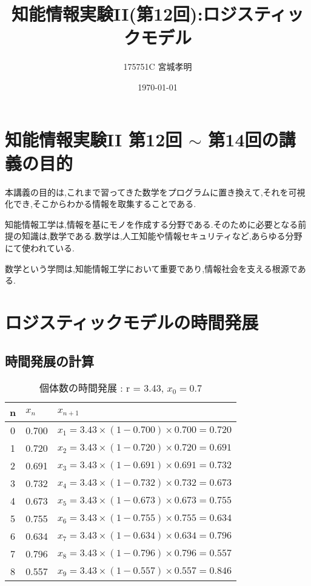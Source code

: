 \documentclass[a4paper,11pt,titlepage]{jarticle}
\title{知能情報実験II(第12回):ロジスティックモデル}
\author{175751C 宮城孝明}
\date{\today}
\begin{document}
\maketitle
\tableofcontents
\clearpage

\section{知能情報実験II 第12回 $ \sim $ 第14回の講義の目的}
本講義の目的は,これまで習ってきた数学をプログラムに置き換えて,それを可視化でき,そこからわかる情報を取集することである.\par
知能情報工学は,情報を基にモノを作成する分野である.そのために必要となる前提の知識は,数学である.数学は,人工知能や情報セキュリティなど,あらゆる分野にて使われている.\par
数学という学問は,知能情報工学において重要であり,情報社会を支える根源である.

\section{ロジスティックモデルの時間発展}
\subsection{時間発展の計算}
 \begin{table}[htb]
\caption{個体数の時間発展 : r = 3.43, $ x_0 = 0.7 $}
\begin{center}
  \begin{tabular}{|c|l|l|} \hline
    n & $ x_n $ & $ x_{n+1} $  \\ \hline 
    0 & 0.700 & $ x_1 = 3.43 \times (1 - 0.700) \times 0.700 = 0.720 $ \\ \hline
    1 & 0.720 & $ x_2 = 3.43 \times (1 - 0.720) \times 0.720 = 0.691 $ \\ \hline
    2 & 0.691 & $ x_3 = 3.43 \times (1 - 0.691) \times 0.691 = 0.732 $ \\ \hline
    3 & 0.732 & $ x_4 = 3.43 \times (1 - 0.732) \times 0.732 = 0.673 $ \\ \hline
    4 & 0.673 & $ x_5 = 3.43 \times (1 - 0.673) \times 0.673 = 0.755 $ \\ \hline
    5 & 0.755 & $ x_6 = 3.43 \times (1 - 0.755) \times 0.755 = 0.634 $ \\ \hline
    6 & 0.634 & $ x_7 = 3.43 \times (1 - 0.634) \times 0.634 = 0.796 $ \\ \hline
    7 & 0.796 & $ x_8 = 3.43 \times (1 - 0.796) \times 0.796 = 0.557 $ \\ \hline
    8 & 0.557 & $ x_9 = 3.43 \times (1 - 0.557) \times 0.557 = 0.846 $ \\ \hline
  \end{tabular}
  \end{center}
\end{table}
\clearpage
\end{document}
